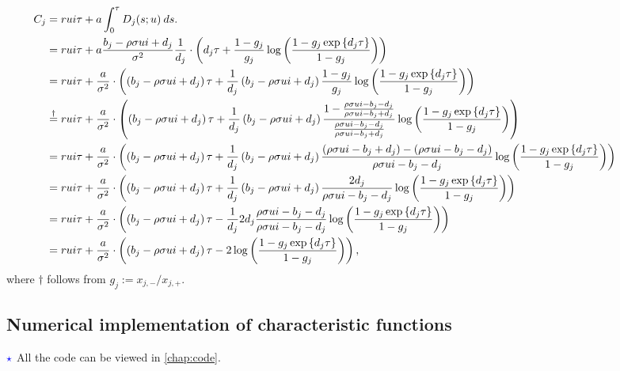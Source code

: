 \documentclass[11pt]{article}
\numberwithin{equation}{section}
\begin{document}
\begin{equation*}
    \hspace*{-1.4cm}
    \begin{aligned}
        C_j&=rui\tau+a\int_0^\tau D_j(s;u)\:ds.\\
        & =rui\tau+a \frac{b_j-\rho \sigma u i+d_j}{\sigma^2} \frac{1}{d_j}\cdot\left(d_j \tau+\frac{1-g_j}{g_j} \log \left(\frac{1-g_j \exp\left\{d_j \tau\right\}}{1-g_j}\right)\right) \\
        & =rui\tau+\frac{a}{\sigma^2}\cdot\left(\left(b_j-\rho \sigma u i+d_j\right) \tau+\frac{1}{d_j}\left(b_j-\rho \sigma u i+d_j\right) \frac{1-g_j}{g_j} \log \left(\frac{1-g_j \exp\left\{d_j \tau\right\}}{1-g_j}\right)\right) \\
        & \overset{\dagger}{=}rui\tau+\frac{a}{\sigma^2}\cdot\left(\left(b_j-\rho \sigma u i+d_j\right) \tau+\frac{1}{d_j}\left(b_j-\rho \sigma u i+d_j\right) \frac{1-\frac{\rho \sigma u i-b_j-d_j}{\rho \sigma u i-b_j+d_j}}{\frac{\rho \sigma u i-b_j-d_j}{\rho \sigma u i-b_j+d_j} }\log \left(\frac{1-g_j \exp\left\{d_j \tau\right\}}{1-g_j}\right)\right) \\
        &=rui\tau+\frac{a}{\sigma^2}\cdot\left(\left(b_j-\rho \sigma u i+d_j\right) \tau+\frac{1}{d_j}\left(b_j-\rho \sigma u i+d_j\right) \frac{\left(\rho \sigma u i-b_j+d_j\right)-\left(\rho \sigma u i-b_j-d_j\right)}{\rho \sigma u i-b_j-d_j} \log \left(\frac{1-g_j \exp\left\{d_j \tau\right\}}{1-g_j}\right)\right) \\
        & =rui\tau+\frac{a}{\sigma^2}\cdot\left(\left(b_j-\rho \sigma u i+d_j\right) \tau+\frac{1}{d_j}\left(b_j-\rho \sigma u i+d_j\right) \frac{2 d_j}{\rho \sigma u i-b_j-d_j} \log \left(\frac{1-g_j \exp\left\{d_j \tau\right\}}{1-g_j}\right)\right) \\
        & =rui\tau+\frac{a}{\sigma^2}\cdot\left(\left(b_j-\rho \sigma u i+d_j\right) \tau-\frac{1}{d_j} 2 d_j \frac{\rho \sigma u i-b_j-d_j}{\rho \sigma u i-b_j-d_j} \log \left(\frac{1-g_j \exp\left\{d_j \tau\right\}}{1-g_j}\right)\right) \\
        &=rui\tau+\frac{a}{\sigma^2}\cdot\left(\left(b_j-\rho \sigma u i+d_j\right) \tau-2 \log \left(\frac{1-g_j \exp\left\{d_j \tau\right\}}{1-g_j}\right)\right),
    \end{aligned}
\end{equation*}
where $\dagger$ follows from $g_j:=x_{j,-}/x_{j,+}$.
\newpage
\subsection{Numerical implementation of characteristic functions
}
$\textcolor{blue}{\star}$ All the code can be viewed in \autoref{chap:code}. 
\end{document}
